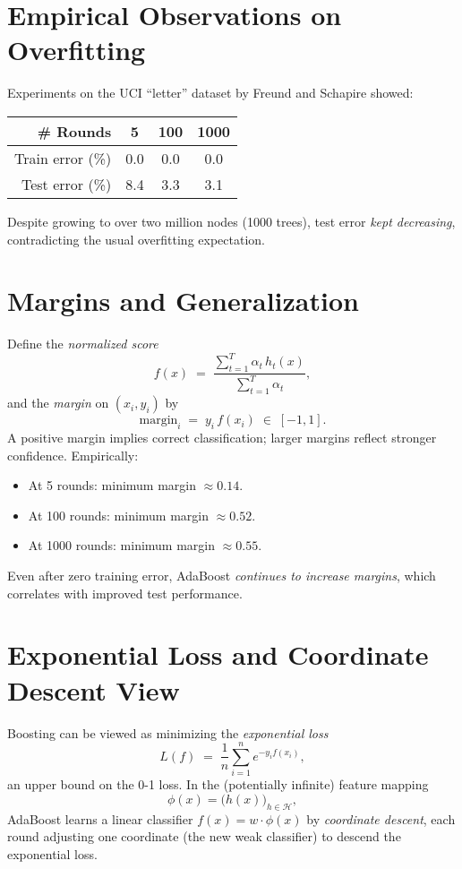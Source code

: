 \documentclass[11pt]{article}
\begin{document}
\section{Empirical Observations on Overfitting}
Experiments on the UCI ``letter'' dataset by Freund and Schapire showed:
\begin{center}
\begin{tabular}{r|ccc}
\hline
\# Rounds & 5 & 100 & 1000 \\
\hline
Train error (\%) & 0.0 & 0.0 & 0.0 \\
Test error (\%)  & 8.4 & 3.3 & 3.1 \\
\hline
\end{tabular}
\end{center}
Despite growing to over two million nodes (1000 trees), test error \emph{kept decreasing}, contradicting the usual overfitting expectation.

\section{Margins and Generalization}
Define the \emph{normalized score}
\[
  f(x)\;=\;\frac{\sum_{t=1}^T\alpha_t\,h_t(x)}{\sum_{t=1}^T\alpha_t},
\]
and the \emph{margin} on $(x_i,y_i)$ by
\[
  \text{margin}_i \;=\; y_i\,f(x_i)\;\in\;[-1,1].
\]
A positive margin implies correct classification; larger margins reflect stronger confidence. Empirically:
\begin{itemize}
  \item At 5 rounds: minimum margin $\approx0.14$.
  \item At 100 rounds: minimum margin $\approx0.52$.
  \item At 1000 rounds: minimum margin $\approx0.55$.
\end{itemize}
Even after zero training error, AdaBoost \emph{continues to increase margins}, which correlates with improved test performance.

\section{Exponential Loss and Coordinate Descent View}
Boosting can be viewed as minimizing the \emph{exponential loss}
\[
  L(f)\;=\;\frac1n\sum_{i=1}^n e^{-y_i f(x_i)},
\]
an upper bound on the 0-1 loss. In the (potentially infinite) feature mapping
\[
  \phi(x) = \bigl(h(x)\bigr)_{h\in\mathcal H},
\]
AdaBoost learns a linear classifier $f(x)=w\cdot\phi(x)$ by \emph{coordinate descent}, each round adjusting one coordinate (the new weak classifier) to descend the exponential loss.
\end{document}
